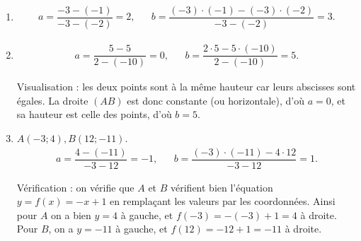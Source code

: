 {\begin{enumerate}
		\item
			\begin{align*}
				a = \dfrac{-3-(-1)}{-3-(-2)} = 2, && b = \dfrac{(-3)\cdot(-1) - (-3)\cdot(-2)}{-3 - (-2)} = 3.
			\end{align*}
			
		\item
			\begin{align*}
				a = \dfrac{5-5}{2-(-10)} = 0, && b = \dfrac{2\cdot5 - 5 \cdot(-10)}{2-(-10)} = 5.
			\end{align*}
			
			Visualisation : les deux points sont à la même hauteur car leurs abscisses sont égales.
			La droite $(AB)$ est donc constante (ou horizontale), d'où $a=0$, et sa hauteur est celle des points, d'où $b=5$.
			
		\item $A(-3;4), B(12;-11)$.
			\begin{align*}
				a = \dfrac{4-(-11)}{-3-12} = -1, && b = \dfrac{(-3)\cdot(-11) - 4\cdot12}{-3-12} = 1.
			\end{align*}
			
			Vérification : on vérifie que $A$ et $B$ vérifient bien l'équation $y=f(x) = -x +1$ en remplaçant les valeurs par les coordonnées.
			Ainsi pour $A$ on a bien $y=4$ à gauche, et $f(-3) = -(-3) + 1 = 4$ à droite.
			Pour $B$, on a $y=-11$ à gauche, et $f(12) = -12 + 1 = -11$ à droite.
	\end{enumerate}


}



